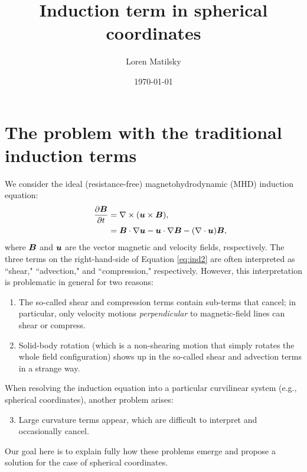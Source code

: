 \documentclass[12pt]{article}
\date{\today}
\author{Loren Matilsky}
\title{Induction term in spherical coordinates}
\begin{document}
\maketitle

\section{The problem with the traditional induction terms}
We consider the ideal (resistance-free) magnetohydrodynamic (MHD) induction equation:
\begin{align}
	\ \ \ \ \ \frac{\partial\bm{B}}{\partial t} &= \nabla\times(\bm{u}\times\bm{B}) \label{eq:ind1},\\
	&= \bm{B}\cdot\nabla\bm{u} - \bm{u}\cdot\nabla\bm{B} -(\nabla\cdot\bm{u})\bm{B}, \label{eq:ind2}
\end{align}
where $\bm{B}$ and $\bm{u}$ are the vector magnetic and velocity fields, respectively. The three terms on the right-hand-side of Equation \eqref{eq:ind2} are often interpreted as ``shear," ``advection," and ``compression," respectively. However, this interpretation is problematic in general for two reasons:

\begin{enumerate}
	\item The so-called shear and compression terms contain sub-terms that cancel; in particular, only velocity motions \textit{perpendicular} to magnetic-field lines can shear or compress. \label{enum:problem1}
	\item Solid-body rotation (which is a non-shearing motion that simply rotates the whole field configuration) shows up in the so-called shear and advection terms in a strange way. \label{enum:problem2}
\end{enumerate}
When resolving the induction equation into a particular curvilinear system (e.g., spherical coordinates), another problem arises:
\begin{enumerate}
	\setcounter{enumi}{2}
	\item Large curvature terms appear, which are difficult to interpret and occasionally cancel. \label{enum:problem3}
\end{enumerate}
Our goal here is to explain fully how these problems emerge and propose a solution for the case of spherical coordinates. 
\end{document}
